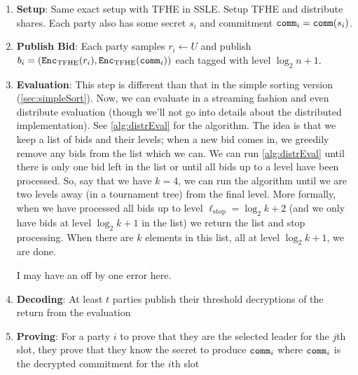 \documentclass[11pt]{article}
\begin{document}
\begin{enumerate}
	\item \textbf{Setup}: Same exact setup with TFHE in SSLE. Setup TFHE and distribute shares.
	      Each party also has some secret $s_i$ and commitment $\texttt{comm}_i = \texttt{comm}(s_i)$.
	\item \textbf{Publish Bid}: Each party samples $r_i \leftarrow U$ and publish $b_i = (\texttt{Enc}_{\mathrm{TFHE}}(r_i), \texttt{Enc}_{\mathrm{TFHE}}(\texttt{comm}_i))$ each tagged with level $\log_2 n + 1$.
	\item \textbf{Evaluation}: This step is different than that in the simple sorting version (\cref{sec:simpleSort}).
	      Now, we can evaluate in a streaming fashion and even distribute evaluation (though we'll not go into details about the distributed implementation).
        See \cref{alg:distrEval} for the algorithm. The idea is that we keep a list of bids and their levels;
        when a new bid comes in, we greedily remove any bids from the list which we can. We can run \cref{alg:distrEval} 
        until there is only one bid left in the list or until all bids up to a level have been processed.
        So, say that we have $k = 4$, we can run the algorithm until we are two levels away (in a tournament tree) from the final level.
        More formally, when we have processed all bids up to level $\ell_{\mathrm{stop}} = \log_2 k + 2$ (and we only have bids at level $\log_2 k + 1$ in the list) we return the list and stop processing.
        When there are $k$ elements in this list, all at level $\log_2 k + 1$, we are done.
        \begin{remark}
          I may have an off by one error here.
        \end{remark}
	      
	\item \textbf{Decoding}: At least $t$ parties publish their threshold decryptions of the return from the evaluation
	\item \textbf{Proving}: For a party $i$ to prove that they are the selected leader for the $j$th slot, they prove that they know the secret to produce $\texttt{comm}_i$
	      where $\texttt{comm}_i$ is the decrypted commitment for the $i$th slot
\end{enumerate}



\end{document}
